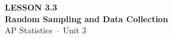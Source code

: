 \documentclass[aspectratio=169, 11pt]{beamer}
\begin{document}
{
\begin{frame}[plain]
  \vspace{2.8cm}\hspace{0.55cm}%
  \begin{minipage}{0.9\textwidth}
    {\color{goldacc}\bfseries\small LESSON 3.3}\\[0.5cm]
    {\color{white}\bfseries\LARGE Random Sampling and Data Collection}\\[1.2cm]
    {\color{skymid}\small AP Statistics~$\cdot$~Unit 3}
  \end{minipage}
\end{frame}
}

\begin{frame}[t, plain]
\end{frame}
\end{document}

